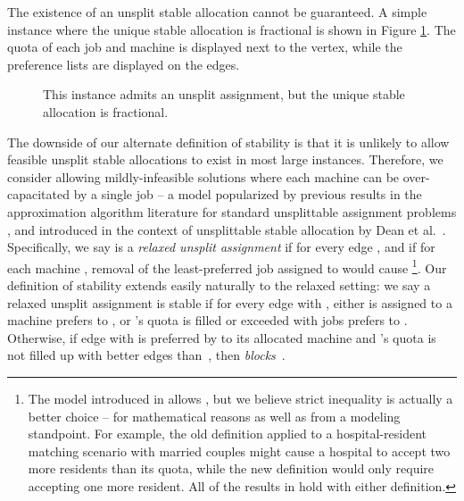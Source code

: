 \documentclass{llncs}
\newcommand{\mycaption}[2]
 {\begin{center} \parbox{4in}{\caption{\small #2 \label{#1}}} \end{center}}
\begin{document}
The existence of an unsplit stable allocation cannot be guaranteed. A
simple instance where the unique stable allocation is fractional is
shown in Figure \ref{label5}.  The quota of
each job and machine is displayed next to the vertex, while the preference lists are displayed on the edges.

\begin{figure}[t]
\begin{center}
\mycaption{label5}{This instance admits an unsplit assignment, but 
the unique stable allocation is fractional.}
\end{center}
\end{figure}

  The downside of our
alternate definition of stability is that it is unlikely to allow
feasible unsplit stable allocations to exist in most large instances.
Therefore, we consider allowing mildly-infeasible solutions where each
machine can be over-capacitated by a single job -- a model popularized
by previous results in the approximation algorithm literature for
standard unsplittable assignment problems
\cite{DinitzGG99,Skutella00,ShmoysT93}, and introduced in the context
of unsplittable stable allocation by Dean et al.~\cite{dean_unsplit}.
Specifically, we say  is a \emph{relaxed unsplit assignment} if
 for every edge , and if for each
machine , removal of the least-preferred job assigned to  would
cause \footnote{The model introduced in
  \cite{dean_unsplit} allows , but we believe strict
  inequality is actually a better choice -- for mathematical reasons
  as well as from a modeling standpoint.  For example, the old
  definition applied to a hospital-resident matching scenario with
  married couples might cause a hospital to accept two more residents
  than its quota, while the new definition would only require
  accepting one more resident.  All of the
  results in \cite{dean_unsplit} hold with either definition.}.  Our
definition of stability extends easily naturally to the relaxed
setting: we say a relaxed unsplit assignment  is stable if for
every edge  with , either  is assigned to a machine
 prefers to , or 's quota is filled or exceeded with jobs 
prefers to .  Otherwise, if edge  with  is preferred
by  to its allocated machine and 's quota is not filled up with
better edges than~, then  \emph{blocks}~.
\end{document}
